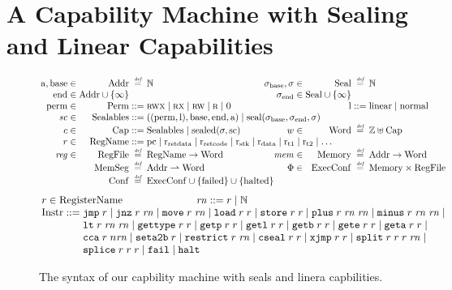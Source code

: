 \documentclass[acmsmall,review,anonymous]{acmart}\settopmatter{printfolios=true,printccs=false,printacmref=false}
\renewcommand{\MemSeg}{\shareddom{MemSeg}}
\renewcommand{\Reg}{\shareddom{RegFile}}
\renewcommand{\RegName}{\shareddom{RegName}}
\renewcommand{\SealableCaps}{\shareddom{Sealables}}
\begin{document}
\section{A Capability Machine with Sealing and Linear Capabilities}
\label{sec:cap-mach-w-seal-and-lin}
\begin{figure}[tb]
  \centering
  \[
  \arraycolsep=1.4pt
  \begin{array}{rrcl l rrcl}
   \addrbnf,\basebnf \in & \Addr & \defeq & \nats & \phantom{mak} & \sealbasebnf, \sigma \in & \Seal & \defeq & \nats\\
    \aendbnf \in & \Addr \cup \{\infty \} & & & & \sealendbnf \in & \Seal \cup \{\infty \}& &\\
    \permbnf \in& \Perm & \defbnf & \rwx \mid \rx \mid \rw \mid \ro \mid \noperm & & &\linbnf & \defbnf & \linear \mid \normal\\
    \vsc \in &\SealableCaps&\defbnf & \multicolumn{6}{l}{((\permbnf,\linbnf),\basebnf,\aendbnf,\addrbnf) \mid \seal{\sealbasebnf,\sealendbnf,\sigma}}\\
    c \in&\Caps& \defbnf &  \SealableCaps \mid \sealed{\sigma,\scbnf} & & w \in &\Word & \defeq & \ints \uplus \Caps\\ 
    r \in& \RegName & \defbnf & \multicolumn{6}{l}{\pcreg \mid \rretd \mid \rretc \mid \rstk \mid \rdata \mid \rtmp{1} \mid \rtmp{2} \mid \dots} \\
    \reg \in &\Reg & \defeq & \RegName \fun \Word & & \mem \in&\Mem & \defeq & \Addr \fun \Word\\
    &\MemSeg & \defeq & \Addr \parfun \Word & & \Phi \in & \ExecConf & \defeq & \Mem \times \Reg\\
    &\Conf & \defeq & \multicolumn{6}{l}{\ExecConf \cup \{\failed\} \cup \{\halted\} }
  \end{array}
\]
\[
  \arraycolsep=1.4pt
\begin{array}{rcl}
\multicolumn{3}{l}{    \arraycolsep=0pt
      \com{r} \in  \tRegName \hspace{2.5cm}   \com{\rn} \defbnf \com{r} \mid \nats
}\\
  \Instr &\defbnf & \tjmp{\com{r}} \mid \tjnz{\com{r}}{\com{\rn}} \mid \tmove{\com{r}}{\com{\rn}} \mid \tload{\com{r}}{\com{r}} \mid \tstore{\com{r}}{\com{r}} \mid \tplus{\com{r}}{\com{\rn}}{\com{\rn}} \mid \tminus{\com{r}}{\com{\rn}}{\com{\rn}} \mid\\
         & & \tlt{\com{r}}{\com{\rn}}{\com{\rn}} \mid \tisptr{\com{r}}{\com{r}} \mid\tgetp{\com{r}}{\com{r}} \mid \tgetlin{\com{r}}{\com{r}} \mid \tgetb{\com{r}}{\com{r}} \mid \tgete{\com{r}}{\com{r}} \mid \tgeta{\com{r}}{\com{r}}  \mid \\
  & & \tcca{\com{r}}{\com{n\rn}} \mid \tsetatob{\com{r}} \mid \trestrict{\com{r}}{\com{\rn}} \mid \tcseal{\com{r}}{\com{r}} \mid \txjmp{\com{r}}{\com{r}} \mid  \tsplit{\com{r}}{\com{r}}{\com{r}}{\com{\rn}} \mid\\ 
      & & \tsplice{\com{r}}{\com{r}}{\com{r}} \mid \tfail \mid \thalt 
\end{array}
\]
  \caption{The syntax of our capbility machine with seals and linera capbilities.}
  \label{fig:target-syntax}
\end{figure}
\end{document}
